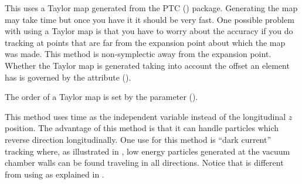 \begin{description}
\item[\vn{Taylor}]
This uses a Taylor map generated from the PTC ()
package. Generating the map may take time but once you have it it
should be very fast. One possible problem with using a Taylor map is
that you have to worry about the accuracy if you do tracking at points
that are far from the expansion point about which the map was
made. This method is non-symplectic away from the expansion
point. Whether the Taylor map is generated taking into account the
offset an element has is governed by the 
attribute ().  

The order of a Taylor map is set by the 
parameter ().

\item[\vn{Time_Runge_Kutta}]
This method uses time as the independent variable instead of the longitudinal $z$
position. The advantage of this method is that it can handle particles which reverse
direction longitudinally.  One use for this method is ``dark current'' tracking where, as
illustrated in , low energy particles generated at the vacuum chamber
walls can be found traveling in all directions. Notice that  is
different from using  as explained in .

\end{description}


